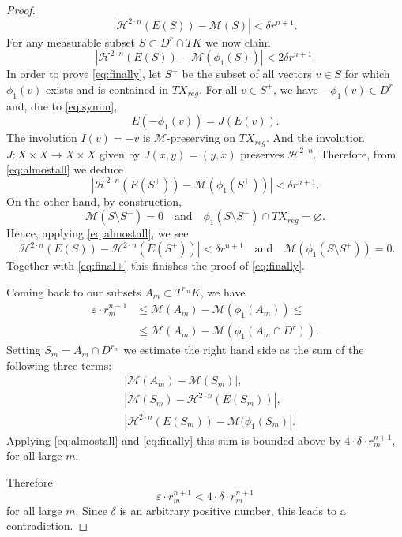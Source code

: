 \documentclass[12pt,leqno,intlimits]{amsart}
\numberwithin{equation}{section}
\theoremstyle{definition}
\theoremstyle{remark}
\def\:{\colon}
\def\emptyset{\varnothing}
\begin{document}
\begin{proof}
\begin{equation}
|\mathcal H^{2\cdot n} (E(S)) - \mathcal M (S)| < \delta r^{n+1}.
\end{equation}
For any measurable subset $S\subset D^r \cap TK$ we now claim
\begin{equation} \label{eq:finally}
|\mathcal H^{2\cdot n} (E(S)) - \mathcal M (\phi _1 (S))| < 2 \delta r^{n+1}.
\end{equation}
In order to prove \eqref{eq:finally}, let $S^+$ be the subset of all vectors $v\in S $ for which $\phi_1 (v)$ exists and is contained in $TX_{reg}$.
For all $v\in S^+$, we have $-\phi _1 (v) \in D^r$ and, due to \eqref{eq:symm},
$$E(-\phi_1 (v)) =J(E(v)).$$
The involution $I(v)=-v$ is $\mathcal M$-preserving on $TX_{reg}$. And the involution
$J\:X\times X\to X\times X$ given by $J(x,y)=(y,x)$ preserves $\mathcal H^{2\cdot n}$. Therefore, from \eqref{eq:almostall} we deduce
\begin{equation} \label{eq:final+}
|\mathcal H^{2\cdot n} (E(S^+)) - \mathcal M (\phi _1 (S^+))| < \delta r^{n+1}.
\end{equation}
On the other hand, by construction,
$$ \mathcal M (S\setminus S^+ )=0
\quad\text{and}\quad
\phi _1 (S\setminus S^+)\cap TX_{reg} =\emptyset.$$
Hence, applying \eqref{eq:almostall}, we see
$$|\mathcal H^{2\cdot n} (E(S))- \mathcal H^{2\cdot n} (E(S^+))|< \delta r^{n+1}
\quad\text{and}\quad
\mathcal M (\phi _1 (S\setminus S^+)) =0.$$
Together with \eqref{eq:final+} this finishes the proof of \eqref{eq:finally}.

Coming back to our subsets $A_m\subset T^{r_m} K$, we have
\begin{align*}
\varepsilon \cdot r_m^ {n+1} &\leq \mathcal M ( A_m) - \mathcal M( \phi _1 (A_m)) \leq 
\\
&\leq\mathcal M ( A_m) - \mathcal M( \phi _1 (A_m\cap D^r)).
\end{align*}
Setting $S_m=A_m\cap D^{r_m}$ we estimate the right hand side as the sum of the following three terms:
\begin{align*}
&|\mathcal M (A_m) - \mathcal M(S_m)|,
\\
&|\mathcal M (S_m ) - \mathcal H^{2\cdot n} (E(S_m) )|,
\\
&| \mathcal H ^{2\cdot n} (E(S_m)) - \mathcal M (\phi _1(S_m)|.
\end{align*}
Applying \eqref{eq:almostall} and \eqref{eq:finally} this sum is bounded above by $4{\cdot}\delta{\cdot} r _m^{n+1}$, for all large $m$.

Therefore
\[\varepsilon \cdot r_m^ {n+1}< 4{\cdot} \delta{\cdot} r _m^{n+1}\]
for all large $m$.
Since $\delta$ is an arbitrary positive number, this leads to a contradiction.
\end{proof}
\end{document}
